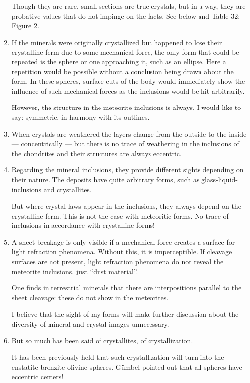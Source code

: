 \documentclass[a4paper, 12pt, oneside]{article}
\begin{document}
\begin{enumerate}
    Though they are rare, small sections are true crystals, but in a way, they are probative values that do not impinge on the facts. See below and Table 32: Figure 2.
    \item If the minerals were originally crystallized but happened to lose their crystalline form due to some mechanical force, the only form that could be repeated is the sphere or one approaching it, such as an ellipse. Here a repetition would be possible without a conclusion being drawn about the form. In these spheres, surface cuts of the body would immediately show the influence of such mechanical forces as the inclusions would be hit arbitrarily.
    
    However, the structure in the meteorite inclusions is always, I would like to say: symmetric, in harmony with its outlines.
    \item When crystals are weathered the layers change from the outside to the inside — concentrically — but there is no trace of weathering in the inclusions of the chondrites and their structures are always eccentric.
    \item Regarding the mineral inclusions, they provide different sights depending on their nature. The deposits have quite arbitrary forms, such as glass-liquid-inclusions and crystallites.
    
    But where crystal laws appear in the inclusions, they always depend on the crystalline form. This is not the case with meteoritic forms. No trace of inclusions in accordance with crystalline forms!
    \item A sheet breakage is only visible if a mechanical force creates a surface for light refraction phenomena. Without this, it is imperceptible. If cleavage surfaces are not present, light refraction phenomena do not reveal the meteorite inclusions, just ``dust material''.
    
    One finds in terrestrial minerals that there are interpositions parallel to the sheet cleavage: these do not show in the meteorites.
    
    I believe that the sight of my forms will make further discussion about the diversity of mineral and crystal images unnecessary.
    \item But so much has been said of crystallites, of crystallization.
    
    It has been previously held that such crystallization will turn into the enstatite-bronzite-olivine spheres. Gümbel pointed out that all spheres have eccentric centers!
    

\end{enumerate}
\end{document}
